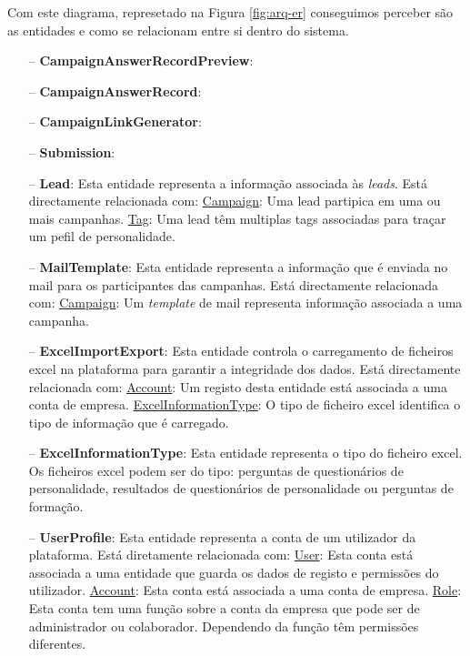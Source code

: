 Com este diagrama, represetado na Figura \ref{fig:arq-er} conseguimos perceber são as entidades e como se relacionam entre si dentro do sistema.

\begin{itemize}
	\item[--] \textbf{CampaignAnswerRecordPreview}: 
		\subitem \underline{}
		\subitem \underline{}
	\item[--] \textbf{CampaignAnswerRecord}: 
		\subitem \underline{}
		\subitem \underline{}
	\item[--] \textbf{CampaignLinkGenerator}: 
		\subitem \underline{}
		\subitem \underline{}
	\item[--] \textbf{Submission}: 
		\subitem \underline{}
		\subitem \underline{}
	\item[--] \textbf{Lead}: Esta entidade representa a informação associada às \textit{leads}. Está directamente relacionada com:
		\subitem \underline{Campaign}: Uma lead partipica em uma ou mais campanhas.
		\subitem \underline{Tag}: Uma lead têm multiplas tags associadas para traçar um pefil de personalidade.
	\item[--] \textbf{MailTemplate}: Esta entidade representa a informação que é enviada no mail para os participantes das campanhas. Está directamente relacionada com:
		\subitem \underline{Campaign}: Um \textit{template} de mail representa informação associada a uma campanha.
	\item[--] \textbf{ExcelImportExport}: Esta entidade controla o carregamento de ficheiros excel na plataforma para garantir a integridade dos dados. Está directamente relacionada com:
		\subitem \underline{Account}: Um registo desta entidade está associada a uma conta de empresa.
		\subitem \underline{ExcelInformationType}: O tipo de ficheiro excel identifica o tipo de informação que é carregado.
	\item[--] \textbf{ExcelInformationType}: Esta entidade representa o tipo do ficheiro excel. Os ficheiros excel podem ser do tipo: perguntas de questionários de personalidade, resultados de questionários de personalidade ou perguntas de formação.
	\item[--] \textbf{UserProfile}: Esta entidade representa a conta de um utilizador da plataforma. Está diretamente relacionada com:
		\subitem \underline{User}: Esta conta está associada a uma entidade que guarda os dados de registo e permissões do utilizador.
		\subitem \underline{Account}: Esta conta está associada a uma conta de empresa.
		\subitem \underline{Role}: Esta conta tem uma função sobre a conta da empresa que pode ser de administrador ou colaborador. Dependendo da função têm permissões diferentes.

\end{itemize}
